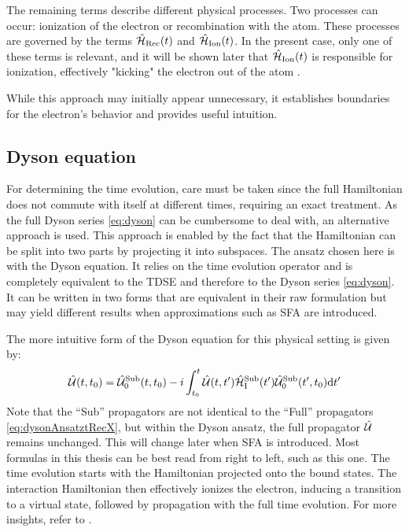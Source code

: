 The remaining terms describe different physical processes.
Two processes can occur: ionization of the electron or recombination with the atom.
These processes are governed by the terms $\hat{\mathcal{H}}_{\mathrm{Rec}}(t)$ and $\hat{\mathcal{H}}_{\mathrm{Ion}}(t)$.
In the present case, only one of these terms is relevant, and it will be shown later that $\hat{\mathcal{H}}_{\mathrm{Ion}}(t)$ is responsible for ionization, effectively "kicking" the electron out of the atom \cite{Ivanov20012005}.

While this approach may initially appear unnecessary, it establishes boundaries for the electron's behavior and provides useful intuition.










\subsection{Dyson equation}
For determining the time evolution, care must be taken since the full Hamiltonian does not commute with itself at different times, requiring an exact treatment.
As the full Dyson series \eqref{eq:dyson} can be cumbersome to deal with, an alternative approach is used.
This approach is enabled by the fact that the Hamiltonian can be split into two parts by projecting it into subspaces.
The ansatz chosen here is with the Dyson equation.
It relies on the time evolution operator and is completely equivalent to the TDSE and therefore to the Dyson series \eqref{eq:dyson}.
It can be written in two forms that are equivalent in their raw formulation but may yield different results when approximations such as SFA are introduced.\

The more intuitive form of the Dyson equation for this physical setting is given by:
\begin{equation}
    \hat{\mathcal{U}}(t,t_0)=\hat{\mathcal{U}}^{\mathrm{Sub}}_0(t,t_0)-i\int_{t_0}^{t} \hat{\mathcal{U}}(t,t')\hat{\mathcal{H}}^{\mathrm{Sub}}_{\mathrm{I}}(t')\hat{\mathcal{U}}^{\mathrm{Sub}}_0(t',t_0) \mathrm{d} t'       \label{eq:dysonAnsatzODE}
\end{equation}
Note that the ``Sub'' propagators are not identical to the ``Full'' propagators \eqref{eq:dysonAnsatztRecX}, but within the Dyson ansatz, the full propagator $\hat{\mathcal{U}}$ remains unchanged.
This will change later when SFA is introduced.
Most formulas in this thesis can be best read from right to left, such as this one.
The time evolution starts with the Hamiltonian projected onto the bound states.
The interaction Hamiltonian then effectively ionizes the electron, inducing a transition to a virtual state, followed by propagation with the full time evolution. 
For more insights, refer to \cite{Ivanov20012005}.

